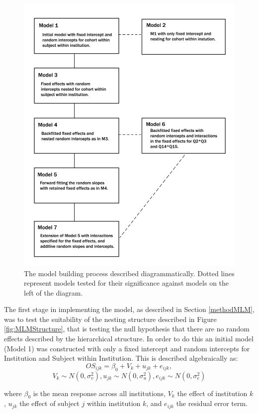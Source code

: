\documentclass[11pt,a4paper]{report}
\begin{document}
\begin{figure}
	\centering
	\includegraphics[width=1\linewidth]{images/MLMmodels}
	\caption{The model building process described diagrammatically. Dotted lines represent models tested for their significance against models on the left of the diagram.}
	\label{fig:MLMmodels}
\end{figure}

The first stage in implementing the model, as described in Section \ref{methodMLM}, was to test the suitability of the nesting structure described in Figure \ref{fig:MLMStructure}, that is testing the null hypothesis that there are no random effects described by the hierarchical structure. In order to do this an initial model (Model 1) was constructed with only a fixed intercept and random intercepts for Institution and Subject within Institution. This is described algebraically as: 
\[OS_{ijk} = \beta_{0} + V_{k} + u_{jk} + e_{ijk}, \]
\[V_{k} \sim N(0, \sigma^{2}_v), u_{jk} \sim N(0, \sigma^{2}_u), e_{ijk} \sim N(0, \sigma^{2}_e)\]

where
$\beta_{0}$ is the mean response across all institutions, 
$V_{k}$ the effect of institution $k$,
$u_{jk}$ the effect of subject $j$ within institution $k$, and
$e_{ijk}$ the residual error term.
\end{document}
